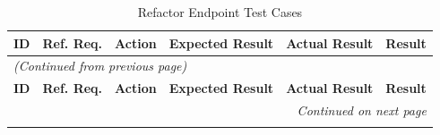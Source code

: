 \documentclass[12pt, titlepage]{article}
\begin{document}
\begin{longtable}{c
    >{\raggedright\arraybackslash}p{1.5cm}
    >{\raggedright\arraybackslash}p{4.5cm}
    >{\raggedright\arraybackslash}p{4cm}
  >{\raggedright\arraybackslash}p{3cm} c}
  \toprule
  \textbf{ID} & \textbf{Ref. Req.} & \textbf{Action} &
  \textbf{Expected Result} & \textbf{Actual Result} & \textbf{Result} \\
  \midrule
  \endfirsthead

  \multicolumn{6}{l}{\textit{(Continued from previous page)}} \\
  \toprule
  \textbf{ID} & \textbf{Ref. Req.} & \textbf{Action} &
  \textbf{Expected Result} & \textbf{Actual Result} & \textbf{Result} \\
  \midrule
  \endhead

  \multicolumn{6}{r}{\textit{Continued on next page}} \\
  \endfoot

  \bottomrule
  \caption{Refactor Endpoint Test Cases}
  \label{table:refactor_endpoint_tests}
  \endlastfoot


\end{longtable}
\end{document}
